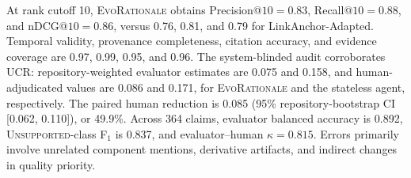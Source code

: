 \documentclass[10pt,conference]{IEEEtran}
\begin{document}
At rank cutoff 10, \textsc{EvoRationale} obtains Precision@$10=0.83$, Recall@$10=0.88$, and nDCG@$10=0.86$, versus 0.76, 0.81, and 0.79 for LinkAnchor-Adapted. Temporal validity, provenance completeness, citation accuracy, and evidence coverage are 0.97, 0.99, 0.95, and 0.96. The system-blinded audit corroborates UCR: repository-weighted evaluator estimates are 0.075 and 0.158, and human-adjudicated values are 0.086 and 0.171, for \textsc{EvoRationale} and the stateless agent, respectively. The paired human reduction is 0.085 (95\% repository-bootstrap CI [0.062, 0.110]), or 49.9\%. Across 364 claims, evaluator balanced accuracy is 0.892, \textsc{Unsupported}-class F$_1$ is 0.837, and evaluator--human $\kappa=0.815$. Errors primarily involve unrelated component mentions, derivative artifacts, and indirect changes in quality priority.
\end{document}
